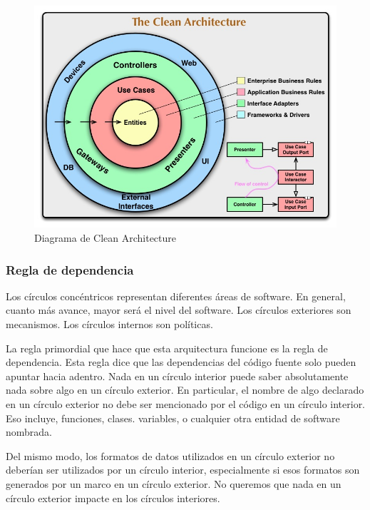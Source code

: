 \begin{figure}
	\centering
	\includegraphics[width = 14cm]{MainMatter/CleanArchitecture.jpg}
	\caption{Diagrama de Clean Architecture }
	\label{fig:clean_architecture}
	
\end{figure}	

\subsubsection{Regla de dependencia}
  
  Los círculos concéntricos representan diferentes áreas de software. En general, cuanto más avance, mayor será el nivel del software. Los círculos exteriores son mecanismos. Los círculos internos son políticas.
  
La regla primordial que hace que esta arquitectura funcione es la regla de dependencia. Esta regla dice que las dependencias del código fuente solo pueden apuntar hacia adentro. Nada en un círculo interior puede saber absolutamente nada sobre algo en un círculo exterior. En particular, el nombre de algo declarado en un círculo exterior no debe ser mencionado por el código en un círculo interior. Eso incluye, funciones, clases. variables, o cualquier otra entidad de software nombrada.


Del mismo modo, los formatos de datos utilizados en un círculo exterior no deberían ser utilizados por un círculo interior, especialmente si esos formatos son generados por un marco en un círculo exterior. No queremos que nada en un círculo exterior impacte en los círculos interiores. 



